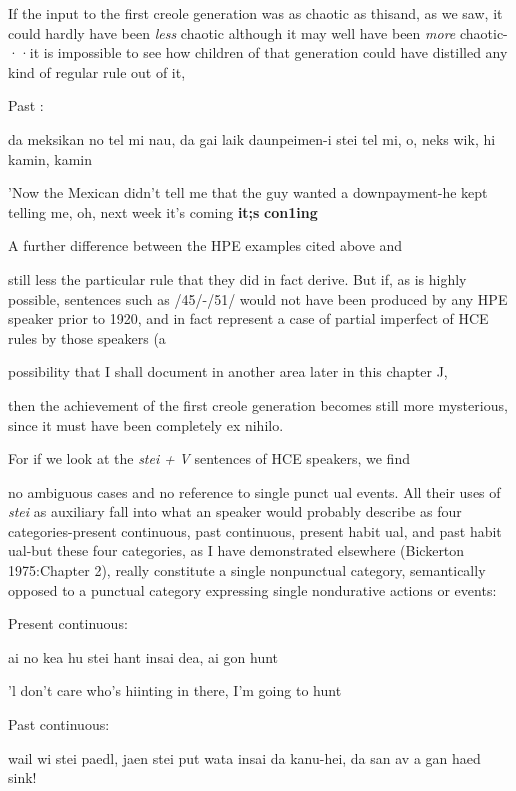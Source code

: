 If the input to the first creole generation was as chaotic as this\-and, as we saw, it could hardly have been \textit{less} chaotic although it may well have been \textit{more} chaotic-··it is impossible to see how children of that generation could have distilled any kind of regular rule out of it,

\ea\label{ex:55}

\glt
\z

Past :

da meksikan no tel mi nau, da gai laik daunpeimen{}-i stei tel mi, o, neks wik, hi kamin, kamin

'Now the Mexican didn't tell me that the guy wanted a down\-payment-he kept telling me, oh, next week it's coming \textbf{it;s} \textbf{con1ing }

A further difference between the HPE examples cited above and

still less the particular rule that they did in fact derive. But if, as is highly possible, sentences such as /45/-/51/ would not have been produced by any HPE speaker prior to 1920, and in fact represent a case of partial imperfect  of HCE rules by those speakers (a

possibility that I shall document in another area later in this chapter J,

then the achievement of the first creole generation becomes still more mysterious, since it must have been completely ex nihilo.

For if we look at the \textit{stei} \textit{+} \textit{V} sentences of HCE speakers, we find

no ambiguous cases and no reference to single punct ual events. All their uses of \textit{stei} as auxiliary fall into what an  speaker would probably describe as four categories-present continuous, past con\-tinuous, present habit ual, and past habit ual-but these four categories, as I have demonstrated elsewhere (Bickerton 1975:Chapter 2), really constitute a single nonpunctual category, semantically opposed to a punctual category expressing single nondurative actions or events:

\ea\label{ex:52}
 Present continuous:
\glt
\z

ai no kea hu stei hant insai dea, ai gon hunt

'l don't care who's hiinting in there, I'm going to hunt

\ea\label{ex:53}
 Past continuous:
\glt
\z

wail wi stei paedl, jaen stei put wata insai da kanu-hei, da san av a gan haed sink!

